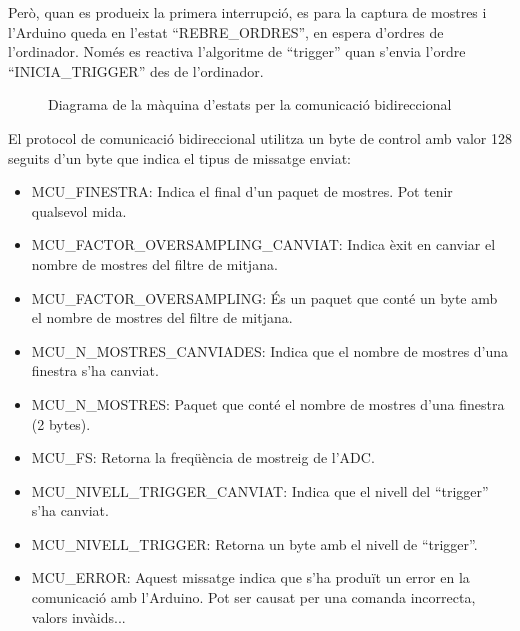 \documentclass{tfgitic}[2023/06/30]
\begin{document}
Però, quan es produeix la primera interrupció, es para la captura de
mostres i l'Arduino queda en l'estat ``REBRE\_ORDRES'', en espera
d'ordres de l'ordinador. Només es reactiva l'algoritme de ``trigger''
quan s'envia l'ordre ``INICIA\_TRIGGER'' des de l'ordinador.

\begin{figure}[!hb]
      \centering
      \caption{Diagrama de la màquina d'estats per la comunicació bidireccional}
\end{figure}

\clearpage

El protocol de comunicació bidireccional utilitza un byte de control
amb valor 128 seguits d'un byte que indica el tipus de missatge
enviat:

\begin{itemize}
\item MCU\_FINESTRA: Indica el final d'un paquet de mostres. Pot tenir
  qualsevol mida.
\item MCU\_FACTOR\_OVERSAMPLING\_CANVIAT: Indica èxit en canviar el
  nombre de mostres del filtre de mitjana.
\item MCU\_FACTOR\_OVERSAMPLING: És un paquet que conté un byte amb el
  nombre de mostres del filtre de mitjana.
\item MCU\_N\_MOSTRES\_CANVIADES: Indica que el nombre de mostres
  d'una finestra s'ha canviat.
\item MCU\_N\_MOSTRES: Paquet que conté el nombre de mostres d'una
  finestra (2 bytes).
\item MCU\_FS: Retorna la freqüència de mostreig de l'ADC.
\item MCU\_NIVELL\_TRIGGER\_CANVIAT: Indica que el nivell del
  ``trigger'' s'ha canviat.
\item MCU\_NIVELL\_TRIGGER: Retorna un byte amb el nivell de
  ``trigger''.
\item MCU\_ERROR: Aquest missatge indica que s'ha produït un error en
  la comunicació amb l'Arduino. Pot ser causat per una comanda
  incorrecta, valors invà\lgem ids...
\end{itemize}
\end{document}
